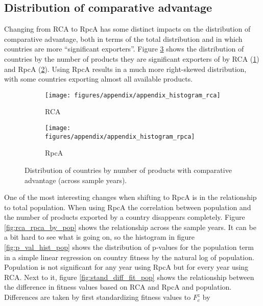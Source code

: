 \documentclass[11pt]{article}
\begin{document}
\begin{appendices}
\subsection{Distribution of comparative advantage}
\label{subsec:dist}

Changing from RCA to RpcA has some distinct impacts on the distribution of comparative advantage, both in terms of the total distribution and in which countries are more ``significant exporters''. Figure \ref{fig:rca_rpca_hist} shows the distribution of countries by the number of products they are significant exporters of by RCA (\ref{fig:rca_hist}) and RpcA (\ref{fig:rpca_hist}). Using RpcA results in a much more right-skewed distribution, with some countries exporting almost all available products.

\begin{figure}
     \centering
     \begin{subfigure}[b]{0.45\textwidth}
         \centering
         \texttt{[image: figures/appendix/appendix\_histogram\_rca]}
         \caption{RCA}
         \label{fig:rca_hist}
     \end{subfigure}
     \hfill
     \begin{subfigure}[b]{0.45\textwidth}
         \centering
         \texttt{[image: figures/appendix/appendix\_histogram\_rpca]}
         \caption{RpcA}
         \label{fig:rpca_hist}
     \end{subfigure}
        \caption{Distribution of countries by number of products with
		  comparative advantage (across sample years).}
        \label{fig:rca_rpca_hist}
\end{figure}

One of the most interesting changes when shifting to RpcA is in the relationship to total population. When using RpcA the correlation between population and the number of products exported by a country disappears completely. Figure \ref{fig:rca_rpca_by_pop} shows the relationship across the sample years. It can be a bit hard to see what is going on, so the histogram in figure \ref{fig:p_val_hist_pop} shows the distribution of p-values for the population term in a simple linear regression on country fitness by the natural log of population. Population is not significant for any year using RpcA but for every year using RCA. Next to it, figure \ref{fig:stand_diff_fit_pop} shows the relationship between the difference in fitness values based on RCA and RpcA and population. Differences are taken by first standardizing fitness values to \(F^{z}_{c}\) by


\end{appendices}
\end{document}
